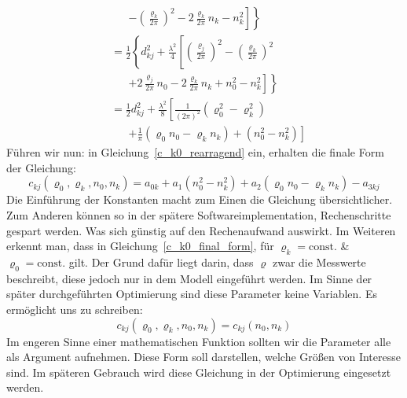 {\begin{align}
	&\phantom{=}\; 
	\left.\left.-\left(\frac{\varrho_k}{2\pi}\right)^2-2\frac{\varrho_k}{2\pi}n_k-n_k^2\right]\right\}\\
%    
    &=\frac{1}{2}\left\{d_{kj}^2+\frac{\lambda^2}{4}\left[\left(\frac{\varrho_j}{2\pi}\right)^2-\left(\frac{\varrho_k}{2\pi}\right)^2 \right.\right.\nonumber\\
    &\phantom{=}\;
   	\left.\left.+2\frac{\varrho_j}{2\pi}n_0-2\frac{\varrho_k}{2\pi}n_k+n_0^2-n_k^2\right]\right\}\\
%	
	&=\frac{1}{2}d_{kj}^2+\frac{\lambda^2}{8}\left[\frac{1}{(2\pi)^2}\left(\varrho_0^2-\varrho_k^2\right) \right.\nonumber\\
	&\phantom{=}\;
	\left. +\frac{1}{\pi}\left(\varrho_0n_0-\varrho_kn_k\right)+\left(n_0^2-n_k^2\right)\right]\label{c_k0_rearragend}
\end{align}
%
Führen wir nun:
%
in Gleichung~\eqref{c_k0_rearragend} ein, erhalten die finale Form der Gleichung:
\begin{equation}
c_{kj}(\varrho_0, \varrho_k, n_0, n_k) = a_{0k}+a_1(n_0^2-n_k^2)+a_2(\varrho_0n_0-\varrho_kn_k)-a_{3kj}\label{c_k0_final_form}   
\end{equation}
%
Die Einführung der Konstanten macht zum Einen die Gleichung übersichtlicher. Zum Anderen können so in der spätere Softwareimplementation, Rechenschritte gespart werden. Was sich günstig auf den Rechenaufwand auswirkt. Im Weiteren erkennt man, dass in Gleichung~\eqref{c_k0_final_form}, für $\varrho_k=\text{const.}$ \& $\varrho_0=\text{const.}$ gilt. Der Grund dafür liegt darin, dass $\varrho$ zwar die Messwerte beschreibt, diese jedoch nur in dem Modell eingeführt werden. Im Sinne der später durchgeführten Optimierung sind diese Parameter keine Variablen. Es ermöglicht uns zu schreiben:
\begin{equation}
c_{kj}(\varrho_0, \varrho_k, n_0, n_k) = c_{kj}(n_0, n_k)
\end{equation}
%
Im engeren Sinne einer mathematischen Funktion sollten wir die Parameter alle als Argument aufnehmen. Diese Form soll darstellen, welche Größen von Interesse sind. Im späteren Gebrauch wird diese Gleichung in der Optimierung eingesetzt werden.\\
}
